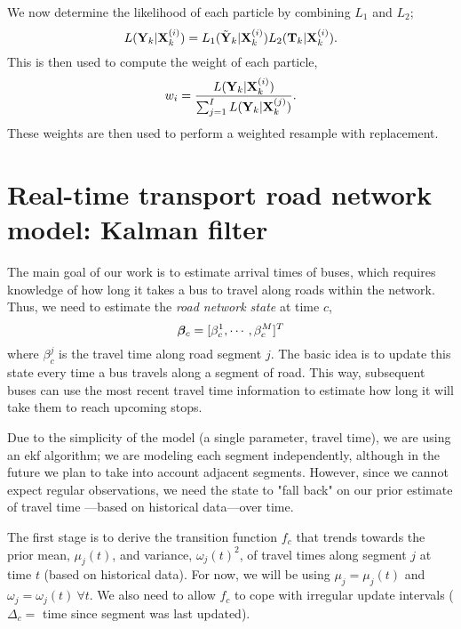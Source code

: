 \documentclass[draftcls,a4paper,onecolumn]{IEEEtran}\usepackage[]{graphicx}\usepackage[]{color}
\begin{document}
We now determine the likelihood of each particle by combining $L_1$ and $L_2$;
\begin{equation}
  \label{eq:particle_likelihood}
  L (\mathbf{Y}_k | \mathbf{X}_k^{(i)}) = L_1(\tilde{\mathbf{Y}}_k|\mathbf{X}_k^{(i)}) L_2(\mathbf{T}_k | \mathbf{X}_k^{(i)}).
\end{equation}
This is then used to compute the weight of each particle,
\begin{equation}
  \label{eq:particle_weights}
  w_i = \frac{L (\mathbf{Y}_k | \mathbf{X}_k^{(i)})}{\sum_{j=1}^I   L (\mathbf{Y}_k | \mathbf{X}_k^{(j)})}.
\end{equation}
These weights are then used to perform a weighted resample with replacement.




\section{Real-time transport road network model: Kalman filter}
\label{sec:kf}

The main goal of our work is to estimate arrival times of buses,
which requires knowledge of how long it takes a bus to
travel along roads within the network.
Thus, we need to estimate the \emph{road network state} at time $c$,
\begin{equation}
  \label{eq:kf_state}
  \boldsymbol{\beta}_c = [\beta^1_c, \cdots, \beta^M_c]^T
\end{equation}
where $\beta^j_c$ is the travel time along road segment $j$.
The basic idea is to update this state every time a bus travels
along a segment of road.
This way, subsequent buses can use the most recent travel time
information to estimate how long it will take them to reach 
upcoming stops.

Due to the simplicity of the model (a single parameter, travel time),
we are using an \gls{ekf} algorithm; 
we are modeling each segment independently, although in the future
we plan to take into account adjacent segments.
However, since we cannot expect regular observations,
we need the state to "fall back" on our prior estimate of travel time%
---based on historical data---over time.

The first stage is to derive the transition function $f_c$ that
trends towards the prior mean, $\mu_j(t)$, and variance, $\omega_j(t)^2$,
of travel times along segment $j$ at time $t$ (based on historical data).
For now, we will be using $\mu_j = \mu_j(t)$ and $\omega_j = \omega_j(t)\ \forall t$.
We also need to allow $f_c$ to cope with irregular update intervals 
($\Delta_c = $ time since segment was last updated).
\end{document}
